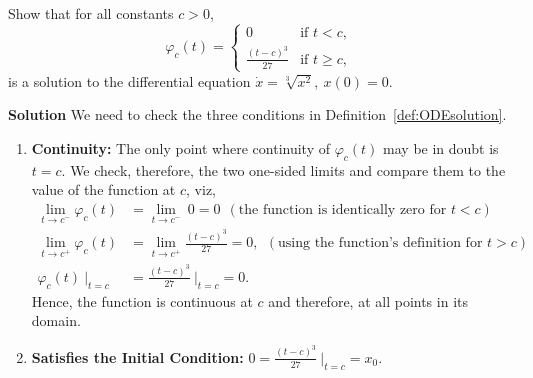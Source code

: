 \begin{example} Show that for all constants $c>0$, 
$$
   \varphi_c(t) = 
    \begin{cases} 
      0 & \text{if } t < c, \\
      \frac{(t-c)^3}{27} & \text{if } t \ge c,
    \end{cases}
$$
is a solution to the differential equation $\dot{x} = \sqrt[3]{x^2}, ~x(0)=0$.
\end{example}
\textbf{Solution} We need to check the three conditions in Definition~\ref{def:ODEsolution}.
 \begin{enumerate}
\renewcommand{\labelenumi}{(\alph{enumi})}
\setlength{\itemsep}{.2cm}
    \item \textbf{Continuity:} The only point where continuity of $ \varphi_c(t)$ may be in doubt is $t=c$. We check, therefore, the two one-sided limits and compare them to the value of the function at $c$, viz,
    \begin{align*}
        \lim_{t \to c^-} \varphi_c(t) &=  \lim_{t \to c^-}~ 0 = 0~~(\text{the function is identically zero for }t< c) \\[1em]
        \lim_{t \to c^+} \varphi_c(t) &=   \lim_{t \to c^+}\frac{(t-c)^3}{27} = 0, ~~(\text{using the function's definition for }t> c) \\[1em]
        \varphi_c(t)~\bigg|_{t=c} &=  \frac{(t-c)^3}{27}~\bigg|_{t=c}  =0.
    \end{align*}
    Hence, the function is continuous at $c$ and therefore, at all points in its domain. 
    
    \item \textbf{Satisfies the Initial Condition:} $ 0= \frac{(t-c)^3}{27}~\bigg|_{t=c} = x_0$.


\end{enumerate}
